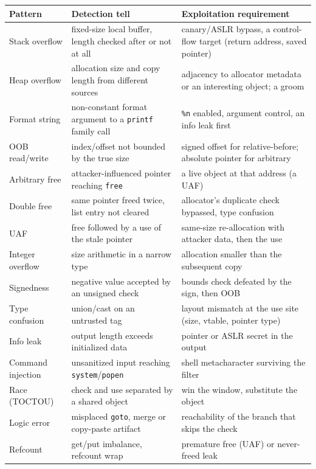 \documentclass[12pt]{Training}
\begin{document}
\begin{center}
\footnotesize
\begin{tabular}{@{}p{2.5cm}|p{5.2cm}|p{6.2cm}@{}}
\toprule
\textbf{Pattern} & \textbf{Detection tell} & \textbf{Exploitation requirement} \\
\midrule
Stack overflow & fixed-size local buffer, length checked after or not at all & canary/ASLR bypass, a control-flow target (return address, saved pointer) \\
Heap overflow & allocation size and copy length from different sources & adjacency to allocator metadata or an interesting object; a groom \\
Format string & non-constant format argument to a \lstinline|printf| family call & \lstinline|%n| enabled, argument control, an info leak first \\
OOB read/write & index/offset not bounded by the true size & signed offset for relative-before; absolute pointer for arbitrary \\
Arbitrary free & attacker-influenced pointer reaching \lstinline|free| & a live object at that address (a UAF) \\
Double free & same pointer freed twice, list entry not cleared & allocator's duplicate check bypassed, type confusion \\
UAF & free followed by a use of the stale pointer & same-size re-allocation with attacker data, then the use \\
Integer overflow & size arithmetic in a narrow type & allocation smaller than the subsequent copy \\
Signedness & negative value accepted by an unsigned check & bounds check defeated by the sign, then OOB \\
Type confusion & union/cast on an untrusted tag & layout mismatch at the use site (size, vtable, pointer type) \\
Info leak & output length exceeds initialized data & pointer or ASLR secret in the output \\
Command injection & unsanitized input reaching \lstinline|system|/\lstinline|popen| & shell metacharacter surviving the filter \\
Race (TOCTOU) & check and use separated by a shared object & win the window, substitute the object \\
Logic error & misplaced \lstinline|goto|, merge or copy-paste artifact & reachability of the branch that skips the check \\
Refcount & get/put imbalance, refcount wrap & premature free (UAF) or never-freed leak \\

\end{tabular}
\end{center}
\end{document}
